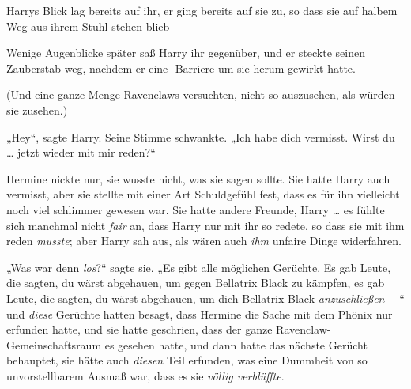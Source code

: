 Harrys Blick lag bereits auf ihr, er ging bereits auf sie zu, so dass sie auf halbem Weg aus ihrem Stuhl stehen blieb —

Wenige Augenblicke später saß Harry ihr gegenüber, und er steckte seinen Zauberstab weg, nachdem er eine -Barriere um sie herum gewirkt hatte.

(Und eine ganze Menge Ravenclaws versuchten, nicht so auszusehen, als würden sie zusehen.)

„Hey“, sagte Harry. Seine Stimme schwankte.
„Ich habe dich vermisst. Wirst du … jetzt wieder mit mir reden?“

Hermine nickte nur, sie wusste nicht, was sie sagen sollte. Sie hatte Harry auch vermisst, aber sie stellte mit einer Art Schuldgefühl fest, dass es für ihn vielleicht noch viel schlimmer gewesen war. Sie hatte andere Freunde, Harry … es fühlte sich manchmal nicht \emph{fair} an, dass Harry nur mit ihr so redete, so dass sie mit ihm reden \emph{musste}; aber Harry sah aus, als wären auch \emph{ihm} unfaire Dinge widerfahren.

„Was war denn \emph{los}?“ sagte sie.
„Es gibt alle möglichen Gerüchte. Es gab Leute, die sagten, du wärst abgehauen, um gegen Bellatrix Black zu kämpfen, es gab Leute, die sagten, du wärst abgehauen, um dich Bellatrix Black \emph{anzuschließen} —“ und \emph{diese} Gerüchte hatten besagt, dass Hermine die Sache mit dem Phönix nur erfunden hatte, und sie hatte geschrien, dass der ganze Ravenclaw-Gemeinschaftsraum es gesehen hatte, und dann hatte das nächste Gerücht behauptet, sie hätte auch \emph{diesen} Teil erfunden, was eine Dummheit von so unvorstellbarem Ausmaß war, dass es sie \emph{völlig verblüffte}.

